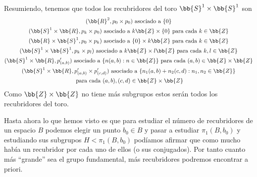 \begin{ejemplo}
\begin{enumerate}
        Resumiendo, tenemos que todos los recubridores del toro $\bb{S}^1\times \bb{S}^1$ son 
        \begin{gather*}
            (\bb{R}^2, p_0\times p_0) \text{ asociado a } \{0\}\\
            (\bb{S}^1\times \bb{R}, p_k\times p_0) \text{ asociado a }k\bb{Z} \times \{0\} \text{ para cada } k\in \bb{Z}\\
            (\bb{R}\times \bb{S}^1, p_0\times p_k) \text{ asociado a } \{0\}\times k\bb{Z} \text{ para cada } k\in \bb{Z}\\
            (\bb{S}^1 \times \bb{S}^1, p_k\times p_l) \text{ asociado a } k\bb{Z}\times l\bb{Z} \text{ para cada } k,l\in \bb{Z}\\
            (\bb{S}^1\times \bb{R}, p'_{(a,b)}) \text{ asociado a } \{n(a,b) : n\in \bb{Z}\} \text{ para cada } (a,b)\in \bb{Z}\times \bb{Z}\\
            (\bb{S}^1\times \bb{R}, p'_{(a,b)}\times p'_{(c,d)}) \text{ asociado a } \{n_1(a,b) + n_2(c,d) : n_1,n_2\in \bb{Z}\}\\ \text{ para cada } (a,b),(c,d)\in \bb{Z}\times \bb{Z}
        \end{gather*}
        Como $\bb{Z}\times \bb{Z}$ no tiene más subgrupos estos serán todos los recubridores del toro.
    \end{enumerate}
\end{ejemplo}

Hasta ahora lo que hemos visto es que para estudiar el número de recubridores de un espacio $B$ podemos elegir un punto $b_0\in B$ y pasar a estudiar $\pi_1(B,b_0)$ y estudiando sus subgrupos $H<\pi_1(B,b_0)$ podíamos afirmar que como mucho había un recubridor por cada uno de ellos (o sus conjugados). Por tanto cuanto más ``grande'' sea el grupo fundamental, más recubridores podremos encontrar a priori. \\

